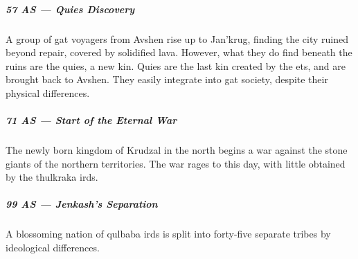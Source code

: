 \subparagraph{57 AS --- Quies Discovery} A group of gat voyagers from Avshen rise up to Jan'krug, finding the city ruined beyond repair, covered by solidified lava.
However, what they do find beneath the ruins are the quies, a new kin.
Quies are the last kin created by the ets, and are brought back to Avshen.
They easily integrate into gat society, despite their physical differences.

\subparagraph{71 AS --- Start of the Eternal War} The newly born kingdom of Krudzal in the north begins a war against the stone giants of the northern territories.
The war rages to this day, with little obtained by the thulkraka irds.

\subparagraph{99 AS --- Jenkash's Separation} A blossoming nation of qulbaba irds is split into forty-five separate tribes by ideological differences.

